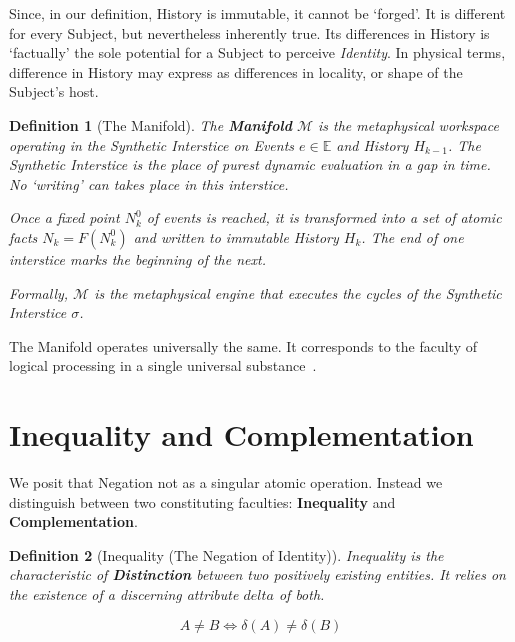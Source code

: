 \documentclass[11pt, a4paper]{article}
\theoremstyle{formalism}
\newtheorem{formalism}{Definition}
\begin{document}
Since, in our definition, History is immutable, it cannot be `forged'. It is
different for every Subject, but nevertheless inherently true. Its differences
in History is `factually' the sole potential for a Subject to perceive {\it
Identity}. In physical terms, difference in History may express as differences
in locality, or shape of the Subject's host.

\begin{formalism}[The Manifold]

    The \textbf{Manifold} $\mathcal{M}$ is the metaphysical workspace operating
    in the Synthetic Interstice on Events $e\in\mathbb{E}$ and History
    $H_{k-1}$. The Synthetic Interstice is the place of purest dynamic
    evaluation in a gap in time. No `writing' can takes place in this
    interstice. 

    Once a fixed point $N^0_k$ of events is reached, it is transformed into a
    set of atomic facts $N_k = \mathit{F}(N^0_k)$ and written to immutable
    History $H_k$. The end of one interstice marks the beginning of the next.

    Formally, $\mathcal{M}$ is the metaphysical engine that executes the cycles
    of the Synthetic Interstice $\sigma$.

\end{formalism}

The Manifold operates universally the same. It corresponds to the faculty of
logical processing in a single universal substance~\cite{AverroesDeAnima}. 

\section{Inequality and Complementation}

We posit that Negation not as a singular atomic operation. Instead we
distinguish between two constituting faculties: \textbf{Inequality} and
\textbf{Complementation}. 

\begin{formalism}[Inequality (The Negation of Identity)]
    Inequality is the characteristic of \textbf{Distinction} between two positively 
    existing entities. It relies on the existence of a discerning attribute $delta$
    of both. 
    
    \begin{equation}
        A \neq B \iff \delta(A) \neq \delta(B)
    \end{equation}
\end{formalism}
\end{document}
